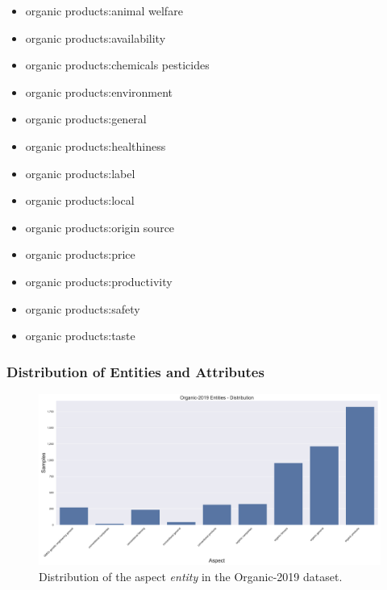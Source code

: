 \begin{multicols}{2}
\begin{itemize}[leftmargin=*]
		\item[] organic products:animal welfare
		\item[] organic products:availability 
		\item[] organic products:chemicals pesticides 
		\item[] organic products:environment
		\item[] organic products:general
		\item[] organic products:healthiness
		\item[] organic products:label 
		\item[] organic products:local 
		\item[] organic products:origin source 
		\item[] organic products:price 
		\item[] organic products:productivity 
		\item[] organic products:safety
		\item[] organic products:taste 
	\end{itemize}
\end{multicols}

\subsubsection*{Distribution of Entities and Attributes}

\begin{figure}[H]
	\centering
	\includegraphics[width=\textwidth]{figures/05_setup/05_organicEntities}
	\caption{Distribution of the aspect \textit{entity} in the Organic-2019 dataset.}
	\label{fig:05_organic2019_Entities}
\end{figure}


